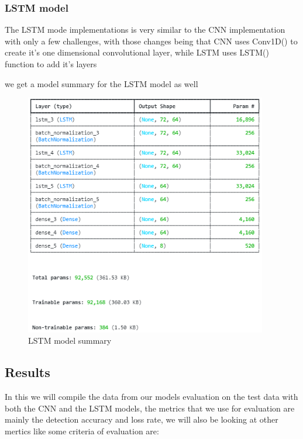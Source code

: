 \subsubsection{LSTM model}
The LSTM mode implementations is very similar to the CNN implementation with only a few challenges, with those changes being that CNN uses Conv1D() to create it's one dimensional convolutional layer, while LSTM uses LSTM() function to add it's layers 






we get a model summary for the LSTM model as well


\begin{figure}[h]
	\centering
	\includegraphics[width=400px]{figures/LSTM_model_summary.png}
	\caption{LSTM model summary}
	\label{fig:test}
\end{figure}













\subsection{Results}
In this we will compile the data from our models evaluation on the test data with both the CNN and the LSTM models, the metrics that we use for evaluation are mainly the detection accuracy and loss rate, we will also be looking at other mertics like
some criteria of evaluation are:


